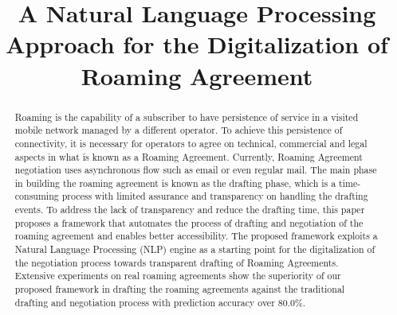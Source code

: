 \documentclass[conference]{style/IEEEtran}
\begin{document}
\title{A Natural Language Processing Approach for the Digitalization of Roaming Agreement}


\maketitle

\begin{abstract}
Roaming is the capability of a subscriber to have persistence of service in a visited mobile network managed by a different operator. To achieve this persistence of connectivity, it is necessary for operators to agree on technical, commercial and legal aspects in what is known as a Roaming Agreement. Currently, Roaming Agreement negotiation uses asynchronous flow such as email or even regular mail. The main phase in building the roaming agreement is known as the drafting phase, which is a time-consuming process with limited assurance and transparency on handling the drafting events. To address the lack of transparency and reduce the drafting time, this paper proposes a framework that automates the process of drafting and negotiation of the roaming agreement and enables better accessibility. The proposed framework exploits a Natural Language Processing (NLP) engine as a starting point for the digitalization of the negotiation process towards transparent drafting of Roaming Agreements. Extensive experiments on real roaming agreements show the superiority of our proposed framework in drafting the roaming agreements against the traditional drafting and negotiation process with prediction accuracy over 80.0\%.
\end{abstract}
\end{document}
